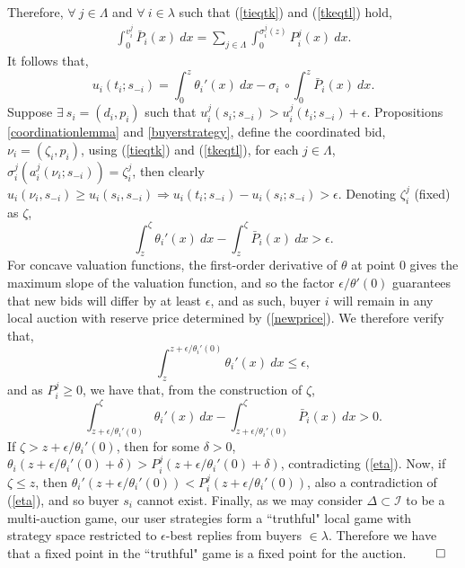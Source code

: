 \documentclass[sigconf, anonymous]{acmart}
\newcommand{\mcI}{\mathcal{I}}
\newcommand{\g}{\sigma}
\theoremstyle{definition}
\begin{document}
Therefore, $\forall \ j\in\Lambda$ and $\forall \ i \in \lambda$ such that
(\ref{tieqtk}) and (\ref{tkeqtl}) hold,
\begin{align*}
    \int_0^{v_i^j} \bar{P}_i(x) \ dx 
    = \sum_{j\in\Lambda}\int_0^{\g_i^j(z)} P_i^j(x) \ dx.
\end{align*}
It follows that,
$$
    u_i(t_i;s_{-i}) = \int_0^{z} \theta_i'(x) \ dx -  \g_i \ \circ \int_0^{z} \bar{P}_i(x) \ dx.
$$
Suppose $\exists \ s_i = (d_i, p_i)$ such that $u_i^j(s_i;s_{-i}) > u_i^j(t_i;
s_{-i}) + \epsilon$. Propositions
\ref{coordinationlemma} and
\ref{buyerstrategy}, define the coordinated bid, $\nu_i=(\zeta_i, p_i)$,
using (\ref{tieqtk}) and (\ref{tkeqtl}),
for each $j\in \Lambda$, $\g_i^j(a_i^j(\nu_i; s_{-i})) = \zeta_i^j$,
then clearly $u_i(\nu_i, s_{-i}) \ge u_i(s_i, s_{-i}) \Rightarrow u_i(t_i;s_{-i}) -
u_i(s_i;s_{-i}) > \epsilon$. Denoting $\zeta_i^j$ (fixed) as $\zeta$, 
$$
    \int_z^{\zeta} {\theta_i}'(x) \ dx-\int_z^{\zeta} \bar{P}_i(x) \ dx > \epsilon.
$$
For concave valuation functions, the first-order derivative of $\theta$ at point
$0$ gives the maximum slope of the valuation function, and so the factor $\epsilon
/ \theta'(0)$ guarantees that new bids will differ by at least
$\epsilon$, and as such, buyer $i$ will remain in
any local auction with reserve price determined by (\ref{newprice}). We therefore
verify that,
$$
    \displaystyle\int_{z}^{z +\epsilon / \theta_i'(0)} \theta_i'(x) \
dx \le \epsilon,
$$
and as $P_i^j \ge 0$, we have that, from the construction of $\zeta$,
$$
    \displaystyle\int_{z+\epsilon / \theta_i'(0)}^\zeta \theta_i'(x) \ dx -
\int_{z+\epsilon / \theta_i'(0)}^\zeta \bar{P}_i(x) \ dx > 0.
$$
If $\zeta > z + \epsilon / \theta_i'(0)$, then for some $\delta >0$,
$\theta_i(z+\epsilon / \theta_i'(0)+\delta) > P_i^j(z+\epsilon /
\theta_i'(0)+\delta)$, contradicting (\ref{eta}).
Now, if $\zeta \le z$, then $\theta_i'(z+\epsilon / \theta_i'(0)) < P_i^j(z+\epsilon /
\theta_i'(0))$, also a contradiction of (\ref{eta}), and so buyer $s_i$ cannot
exist.
Finally, as we may consider $\Delta \subset \mcI$ to be a
multi-auction game, our user strategies form a ``truthful" local game 
with strategy space restricted to $\epsilon$-best replies from buyers $\in
\lambda$. Therefore we have that a fixed point in the ``truthful" game is a fixed point for the auction. 
$\qed$\\
\end{document}

